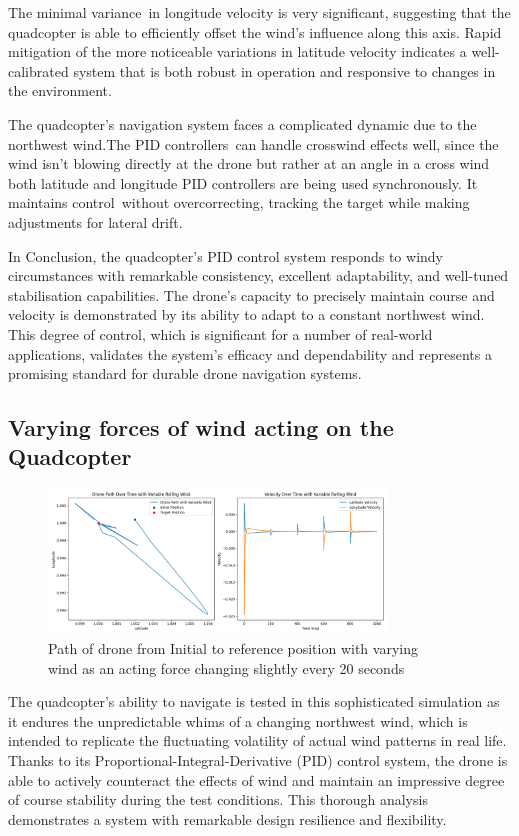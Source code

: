 \documentclass{article}
\begin{document}
The minimal variance in longitude velocity is very significant, suggesting that the quadcopter is able to efficiently offset the wind's influence along this axis. Rapid mitigation of the more noticeable variations in latitude velocity indicates a well-calibrated system that is both robust in operation and responsive to changes in the environment.

The quadcopter's navigation system faces a complicated dynamic due to the northwest wind.The PID controllers can handle crosswind effects well, since the wind isn't blowing directly at the drone but rather at an angle in a cross wind both latitude and longitude PID controllers are being used synchronously. It maintains control without overcorrecting, tracking the 
target while making adjustments for lateral drift.

In Conclusion, the quadcopter's PID control system responds to windy circumstances with remarkable consistency, excellent adaptability, and well-tuned stabilisation capabilities. The drone's capacity to precisely maintain course and velocity is demonstrated by its ability to adapt to a constant northwest wind. This degree of control, which is significant for a number of 
real-world applications, validates the system's efficacy and dependability and represents a promising standard for durable drone navigation systems.

\subsection*{Varying forces of wind acting on the Quadcopter}
\begin{figure}[H]
  \centering
  \includegraphics[width=0.8\textwidth]{Pictures/Drone_path_wind_varys.png} 
  \captionsetup{justification=centering}
  \caption{Path of drone from Initial to reference position with varying\\ wind as an acting force changing slightly every 20 seconds}
  \label{fig:Drone_path_wind_varys}
\end{figure}
The quadcopter's ability to navigate is tested in this sophisticated simulation as it endures the unpredictable whims of a changing northwest wind, which is intended to replicate the fluctuating volatility of actual wind patterns in real life. Thanks to its Proportional-Integral-Derivative (PID) control system, the drone is able to actively counteract the effects 
of wind and maintain an impressive degree of course stability during the test conditions. This thorough analysis demonstrates a system with remarkable design resilience and flexibility.
\end{document}
